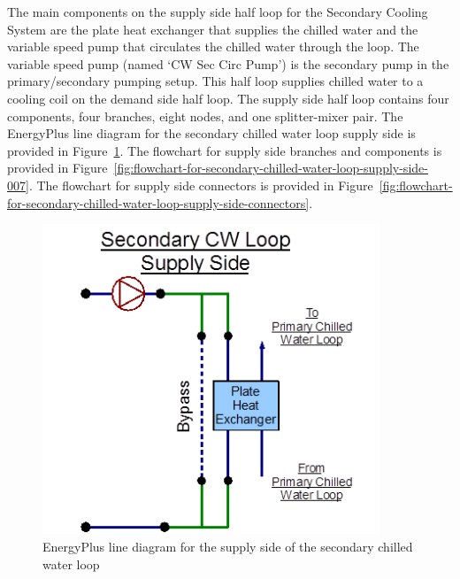 The main components on the supply side half loop for the Secondary Cooling System are the plate heat exchanger that supplies the chilled water and the variable speed pump that circulates the chilled water through the loop. The variable speed pump (named `CW Sec Circ Pump') is the secondary pump in the primary/secondary pumping setup. This half loop supplies chilled water to a cooling coil on the demand side half loop. The supply side half loop contains four components, four branches, eight nodes, and one splitter-mixer pair. The EnergyPlus line diagram for the secondary chilled water loop supply side is provided in Figure~\ref{fig:energyplus-line-diagram-for-the-supply-side-007}. The flowchart for supply side branches and components is provided in Figure~\ref{fig:flowchart-for-secondary-chilled-water-loop-supply-side-007}. The flowchart for supply side connectors is provided in Figure~\ref{fig:flowchart-for-secondary-chilled-water-loop-supply-side-connectors}.

\begin{figure}[hbtp] %
\centering
\includegraphics[width=0.9\textwidth, height=0.9\textheight, keepaspectratio=true]{media/image106.png}
\caption{EnergyPlus line diagram for the supply side of the secondary chilled water loop \protect \label{fig:energyplus-line-diagram-for-the-supply-side-007}}
\end{figure}

